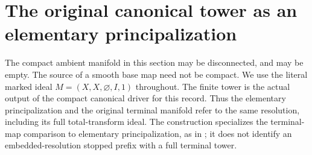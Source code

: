 \section{The original canonical tower as an elementary principalization}

The compact ambient manifold in this section may be disconnected, and may
be empty.  The source of a smooth base map need not be compact.  We use the
literal marked ideal $M=(X,X,\varnothing,I,1)$ throughout.  The finite tower
is the actual output of the compact canonical driver for this record.
Thus the elementary principalization and the original terminal manifold
refer to the same resolution, including its full total-transform ideal.
The construction specializes the terminal-map comparison to elementary
principalization, as in \cite{bierstone-milman08-functoriality}; it does not
identify an embedded-resolution stopped prefix with a full terminal tower.

